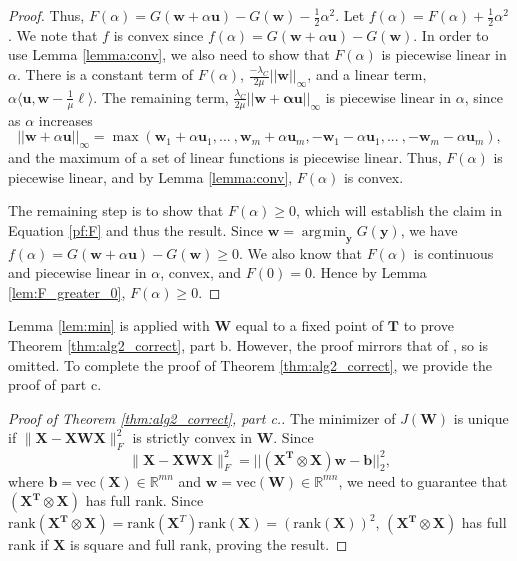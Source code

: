 \documentclass[12pt]{article}
\DeclareMathOperator*{\argmin}{\arg\!\min}
\begin{document}
\begin{proof}
\noindent Thus, $F(\alpha) = G(\mathbf{w} + \alpha \mathbf{u}) - G(\mathbf{w}) - \frac{1}{2}\alpha^2$.  Let  $f(\alpha) = F(\alpha) + \frac{1}{2}\alpha^2$.  We note that $f$ is convex since $f(\alpha) = G(\mathbf{w} + \alpha \mathbf{u}) - G(\mathbf{w})$.  In order to use Lemma \ref{lemma:conv}, we also need to show that $F(\alpha)$ is piecewise linear in $\alpha$.  There is a constant term of $F(\alpha)$, $ \frac{-\lambda_C}{2\mu}|| \mathbf{w}||_\infty$, and a linear term, $\alpha \langle \mathbf{u}, \mathbf{w} - \frac{1}{\mu}\boldsymbol  \ell \rangle$.  The remaining term, $\frac{\lambda_C}{2\mu} ||\mathbf{w+\alpha\mathbf{u}}||_\infty$ is piecewise linear in $\alpha$, since as $\alpha$ increases
\[
||\mathbf{w} + \alpha \mathbf{u}||_\infty = \max(\mathbf{w}_1 + \alpha \mathbf{u}_1, ... \:, \mathbf{w}_m + \alpha \mathbf{u}_m, -\mathbf{w}_1 - \alpha \mathbf{u}_1, ... \:, -\mathbf{w}_m - \alpha \mathbf{u}_m), 
\]
and the maximum of a set of linear functions is piecewise linear.  Thus, $F(\alpha)$ is piecewise linear, and by Lemma \ref{lemma:conv}, $F(\alpha)$ is convex.  

The remaining step is to show that $F(\alpha) \geq 0$, which will establish the claim in Equation \ref{pf:F} and thus the result. 
 Since $\mathbf{w} = \argmin_{\mathbf{y}} G(\mathbf{y})$, we have $f(\alpha) = G(\mathbf{w} + \alpha \mathbf{u}) - G(\mathbf{w}) \geq 0$. We also know that $F(\alpha)$ is continuous and piecewise linear in $\alpha$, convex, and $F(0)=0$.  Hence by Lemma \ref{lem:F_greater_0}, $F(\alpha) \geq 0$.

\end{proof}

Lemma \ref{lem:min} is applied with $\mathbf{W}$ equal to a fixed point of $\mathbf{T}$ to prove Theorem \ref{thm:alg2_correct}, part b.  However, the proof mirrors that of \cite{daubechies_etal_2004}, so is omitted.  To complete the proof of Theorem \ref{thm:alg2_correct}, we provide the proof of part c.

\begin{proof}[Proof of Theorem \ref{thm:alg2_correct}, part c.]
The minimizer of $J(\mathbf{W})$ is unique if $\| \mathbf{X} - \mathbf{XWX} \|_F^2$ is strictly convex in $\mathbf{W}$.  Since
\[
\| \mathbf{X} - \mathbf{XWX} \|_F^2 = ||\mathbf{(X^T \otimes X) w}-\mathbf{b}||^2_2, 
\]
where $\mathbf{b} = \text{vec}(\mathbf{X}) \in \mathbb{R}^{mn}$ and $\mathbf{w} = \text{vec}(\mathbf{W}) \in \mathbb{R}^{mn}$, we need to guarantee that $\mathbf{(X^T \otimes X)}$ has full rank.  Since $\text{rank}\mathbf{(X^T \otimes X)} = \text{rank}(\mathbf{X}^T)\text{rank}(\mathbf{X}) = (\text{rank}(\mathbf{X}))^2$, $\mathbf{(X^T \otimes X)}$ has full rank if $\mathbf{X}$ is square and full rank, proving the result.    
\end{proof}
\end{document}
